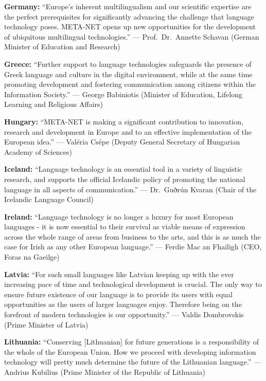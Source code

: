 \documentclass[10pt, plain]{../../metanetpaper}
\begin{document}
\bigskip \textbf{Germany:} ``Europe's inherent multilingualism and our scientific expertise are the perfect prerequisites for significantly advancing the challenge that language technology poses. META-NET opens up new opportunities for the development of ubiquitous multilingual technologies.'' --- Prof.~Dr.~Annette Schavan (German Minister of Education and Research)

\bigskip \textbf{Greece:} ``Further support to language technologies safeguards the presence of Greek language and culture in the digital environment, while at the same time promoting development and fostering communication among citizens within the Information Society.'' --- George Babiniotis (Minister of Education, Lifelong Learning and Religious Affairs)

\bigskip \textbf{Hungary:} ``META-NET is making a significant contribution to innovation, research and development in Europe and to an effective implementation of the European idea.'' --- Valéria Csépe (Deputy General Secretary of Hungarian Academy of Sciences)

\bigskip \textbf{Iceland:} ``Language technology is an essential tool in a variety of linguistic research, and supports the official Icelandic policy of promoting the national language in all aspects of communication.'' --- Dr.~Guðrún Kvaran (Chair of the Icelandic Language Council)

\bigskip \textbf{Ireland:} ``Language technology is no longer a luxury for most European languages - it is now essential to their survival as viable means of expression across the whole range of areas from business to the arts, and this is as much the case for Irish as any other European language.'' --- Ferdie Mac an Fhailigh (CEO, Foras na Gaeilge)

\bigskip \textbf{Latvia:} ``For such small languages like Latvian keeping up with the ever increasing pace of time and technological development is crucial. The only way to ensure future existence of our language is to provide its users with equal opportunities as the users of larger languages enjoy. Therefore being on the forefront of modern technologies is our opportunity.'' --- Valdis Dombrovskis (Prime Minister of Latvia)

\bigskip \textbf{Lithuania:} ``Conserving [Lithuanian] for future generations is a responsibility of the whole of the European Union. How we proceed with developing information technology will pretty much determine the future of the Lithuanian language.'' --- Andrius Kubilius (Prime Minister of the Republic of Lithuania)
\end{document}
